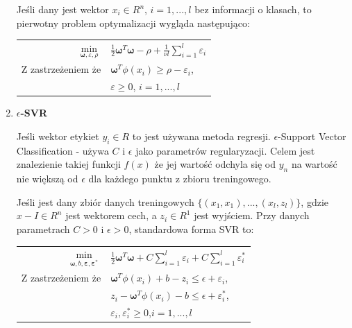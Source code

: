 \documentclass[paper=a4, fontsize=11pt]{scrartcl} %
\numberwithin{equation}{section} %
\numberwithin{figure}{section} %
\begin{document}
\begin{enumerate}
    \par Jeśli dany jest wektor $x_i\in R^n$, $i=1,...,l$ bez informacji o klasach,
    to pierwotny problem optymalizacji wygląda następująco:

    \begin{center}
        \begin{tabular}{rl}
            $\min\limits_{\pmb{\omega},\varepsilon,\rho}$ & $\frac{1}{2}\pmb{\omega}^T\pmb{\omega} -
            \rho + \frac{1}{\nu l}\sum\limits_{i=1}^{l}\varepsilon_i$ \\
            Z zastrzeżeniem że & $\pmb{\omega}^T\phi(x_i)\geq\rho - \varepsilon_i$,\\
                               & $\varepsilon \geq 0$, $i=1,...,l$
        \end{tabular}
    \end{center}

\newpage
\item \textbf{$\epsilon$-SVR}
    \par Jeśli wektor etykiet $y_i \in R$ to jest używana metoda regresji.
    $\epsilon$-Support Vector Classification -  używa $C$ i $\epsilon$ jako
    parametrów regularyzacji. Celem jest znalezienie takiej funkcji $f(x)$
    że jej wartość odchyla się od $y_n$ na wartość nie większą od $\epsilon$
    dla każdego punktu z zbioru treningowego.
    \par Jeśli jest dany zbiór danych treningowych $\{(x_1, x_1),...,
    (x_l, z_l)\}$, gdzie $x-I \in R^n$ jest wektorem cech, a $z_i \in R^1$
    jest wyjściem. Przy danych parametrach $C>0$ i $\epsilon > 0$, standardowa 
    forma SVR to:

    \begin{center}
        \begin{tabular}{rl}
            $\min\limits_{\pmb{\omega},b,\pmb{\varepsilon}, \pmb{\varepsilon}^*}$ &
            $\frac{1}{2}\pmb{\omega}^T\pmb{\omega} + C\sum\limits_{i=1}^{l}
            \varepsilon_i + C\sum\limits_{i=1}^{l}\varepsilon_{i}^{*}$ \\
            Z zastrzeżeniem że & $\pmb{\omega}^T\phi(x_i) + b - z_i \leq \epsilon + \varepsilon_i$, \\
                           & $z_i - \pmb{\omega}^T\phi(x_i) - b \leq  \epsilon + \varepsilon_i^*$, \\
                           & $\varepsilon_i,\varepsilon_i^* \geq 0$,$i=1,...,l$

        \end{tabular}
    \end{center}


\end{enumerate}
\end{document}
